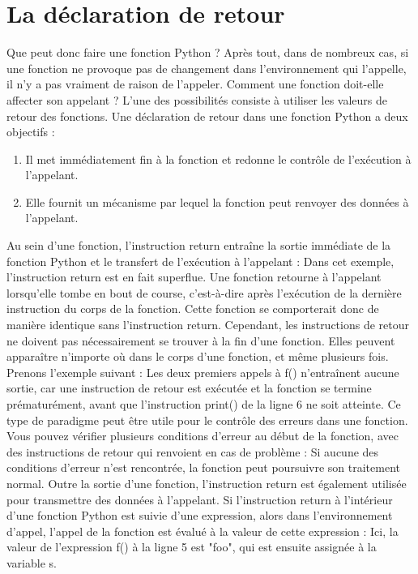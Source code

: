\section{La déclaration de retour}
Que peut donc faire une fonction Python ?  Après tout, dans de nombreux cas, si une fonction ne provoque pas de changement dans l'environnement qui l'appelle, il n'y a pas vraiment de raison de l'appeler. Comment une fonction doit-elle affecter son appelant ?
L'une des possibilités consiste à utiliser les valeurs de retour des fonctions. Une déclaration de retour dans une fonction Python a deux objectifs :
\begin{enumerate}
\item Il met immédiatement fin à la fonction et redonne le contrôle de l'exécution à l'appelant.
\item Elle fournit un mécanisme par lequel la fonction peut renvoyer des données à l'appelant.
\end{enumerate}
Au sein d'une fonction, l'instruction return entraîne la sortie immédiate de la fonction Python et le transfert de l'exécution à l'appelant :
Dans cet exemple, l'instruction return est en fait superflue.  Une fonction retourne à l'appelant lorsqu'elle tombe en bout de course, c'est-à-dire après l'exécution de la dernière instruction du corps de la fonction. Cette fonction se comporterait donc de manière identique sans l'instruction return.
Cependant, les instructions de retour ne doivent pas nécessairement se trouver à la fin d'une fonction. Elles peuvent apparaître n'importe où dans le corps d'une fonction, et même plusieurs fois.  Prenons l'exemple suivant :
Les deux premiers appels à f() n'entraînent aucune sortie, car une instruction de retour est exécutée et la fonction se termine prématurément, avant que l'instruction print() de la ligne 6 ne soit atteinte.
Ce type de paradigme peut être utile pour le contrôle des erreurs dans une fonction. Vous pouvez vérifier plusieurs conditions d'erreur au début de la fonction, avec des instructions de retour qui renvoient en cas de problème :
Si aucune des conditions d'erreur n'est rencontrée, la fonction peut poursuivre son traitement normal.
Outre la sortie d'une fonction, l'instruction return est également utilisée pour transmettre des données à l'appelant.  Si l'instruction return à l'intérieur d'une fonction Python est suivie d'une expression, alors dans l'environnement d'appel, l'appel de la fonction est évalué à la valeur de cette expression :
Ici, la valeur de l'expression f() à la ligne 5 est "foo", qui est ensuite assignée à la variable s.
